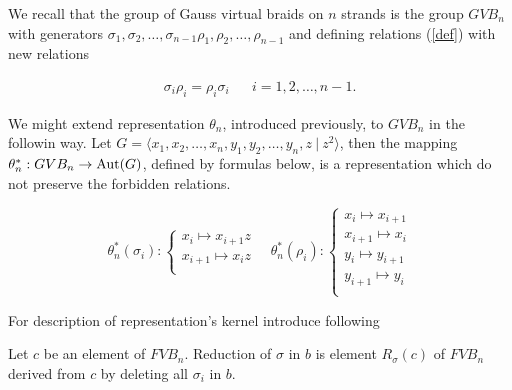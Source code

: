 \documentclass{article}
\begin{document}
We recall that the group of Gauss virtual braids on $n$ strands is the group $GVB_n$ with generators  $\sigma _1,\sigma _2,\dots,\sigma _{n-1}\rho_1,\rho _2,\dots,\rho _{n-1}$ and defining relations (\ref{def}) with new relations 



\begin{align*}

\sigma_i\rho_i=\rho_i\sigma_i && i = 1, 2, \dots,n-1.

\end{align*}



We might extend representation $\theta_n$, introduced previously, to $GVB_n$ in the followin way. Let $G=\langle x_1, x_2, \ldots, x_n, y_1, y_2, \ldots, y_n, z ~|~ z^2\rangle$, then the mapping $\theta_n^*:GVB_n\to {\rm Aut}(G)$, defined by formulas below, is a representation which do not preserve the forbidden relations. 



\begin{equation}\label{defGV}

\theta_n^*(\sigma_i):

\begin{cases}

x_i \mapsto x_{i+1}z\\

x_{i+1} \mapsto x_iz\\

\end{cases}\quad

\theta_n^*(\rho_i):

\begin{cases}

x_i \mapsto x_{i+1}\\

x_{i+1} \mapsto x_i\\

y_i \mapsto y_{i+1}\\

y_{i+1} \mapsto y_i\\

\end{cases}

\end{equation}



For description of representation's kernel introduce following



\begin{definition}

Let $c$ be an element of $FVB_n$. Reduction of $\sigma$ in $b$ is element $R_{\sigma}(c)$ of $FVB_n$ derived from $c$ by deleting all $\sigma_i$ in $b$.

\end{definition}
\end{document}
